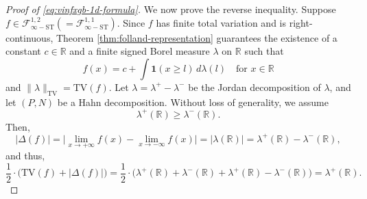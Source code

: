 \documentclass[10pt]{article}
\newcommand{\R}{{\mathbb R}}
\newcommand{\tv}{{\text{TV}}}
\newcommand{\ind}{{\mathbf{1}}}
\begin{document}
\begin{proof}[Proof of \eqref{eq:vinfxgb-1d-formula}]
We now prove the reverse inequality. 
Suppose $f \in \mathcal{F}^{1, 2}_{\infty-\text{ST}} 
(= \mathcal{F}^{1, 1}_{\infty-\text{ST}})$. Since $f$ has finite total 
variation and is right-continuous, 
Theorem \ref{thm:folland-representation} guarantees the existence of a 
constant $c \in \R$ and a finite signed Borel measure $\lambda$ on 
$\R$ such that 
\begin{equation*}
    f(x) = c + \int \ind(x \ge l) \, d\lambda(l)
    \quad \text{for } x \in \R
\end{equation*} 
and $\|\lambda\|_{\text{TV}} = \tv(f)$. 
Let $\lambda = \lambda^+ - \lambda^-$ be the Jordan decomposition of 
$\lambda$, and let $(P, N)$ be a Hahn decomposition. 
Without loss of generality, we assume 
\begin{equation*}
    \lambda^+(\R) \ge \lambda^-(\R).
\end{equation*}
Then, 
\begin{equation*}
    |\Delta(f)| 
    = \big|\lim_{x \to +\infty} f(x) - \lim_{x \to -\infty} f(x)\big|
    = |\lambda(\R)|
    = \lambda^+(\R) - \lambda^-(\R),
\end{equation*}
and thus, 
\begin{equation*}
    \frac{1}{2} \cdot \big(\tv(f) + |\Delta(f)|\big) 
    = \frac{1}{2} \cdot 
    \Big(\lambda^+(\R) + \lambda^-(\R) + \lambda^+(\R) - \lambda^-(\R)\Big) 
    = \lambda^+(\R).
\end{equation*}


\end{proof}
\end{document}

